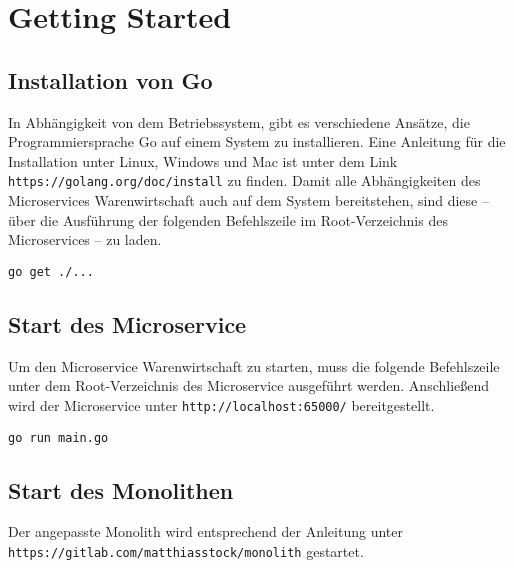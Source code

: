 \section{Getting Started}
\label{sec: Getting Started}

\subsection{Installation von Go}
In Abhängigkeit von dem Betriebssystem, gibt es verschiedene Ansätze, die Programmiersprache Go auf einem System zu installieren. Eine Anleitung für die Installation unter Linux, Windows und Mac ist unter dem Link \texttt{https://golang.org/doc/install} zu finden. Damit alle Abhängigkeiten des Microservices Warenwirtschaft auch auf dem System bereitstehen, sind diese -- über die Ausführung der folgenden Befehlszeile im Root-Verzeichnis des Microservices -- zu laden.
\begin{lstlisting}[caption=Laden der Abhängigkeiten]
go get ./...
\end{lstlisting}

\subsection{Start des Microservice}
Um den Microservice Warenwirtschaft zu starten, muss die folgende Befehlszeile unter dem Root-Verzeichnis des Microservice ausgeführt werden. Anschließend wird der Microservice unter \texttt{http://localhost:65000/} bereitgestellt. 
\begin{lstlisting}[caption=Start des Go-Microservice]
go run main.go
\end{lstlisting}

\subsection{Start des Monolithen}
Der angepasste Monolith wird entsprechend der Anleitung unter \linebreak \texttt{https://gitlab.com/matthiasstock/monolith} gestartet.